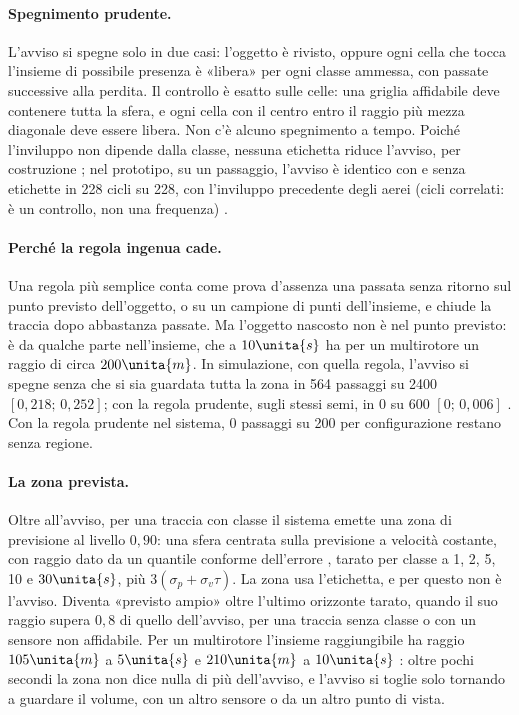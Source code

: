 \paragraph{Spegnimento prudente.} L'avviso si spegne solo in due casi: l'oggetto è rivisto, oppure ogni cella che tocca l'insieme di possibile presenza è «libera» per ogni classe ammessa, con passate successive alla perdita. Il controllo è esatto sulle celle: una griglia affidabile deve contenere tutta la sfera, e ogni cella con il centro entro il raggio più mezza diagonale deve essere libera. Non c'è alcuno spegnimento a tempo. Poiché l'inviluppo non dipende dalla classe, nessuna etichetta riduce l'avviso, per costruzione ; nel prototipo, su un passaggio, l'avviso è identico con e senza etichette in 228 cicli su 228, con l'inviluppo precedente degli aerei (cicli correlati: è un controllo, non una frequenza) .

\paragraph{Perché la regola ingenua cade.} Una regola più semplice conta come prova d'assenza una passata senza ritorno sul punto previsto dell'oggetto, o su un campione di punti dell'insieme, e chiude la traccia dopo abbastanza passate. Ma l'oggetto nascosto non è nel punto previsto: è da qualche parte nell'insieme, che a $10\unita{s}$ ha per un multirotore un raggio di circa $200\unita{m}$. In simulazione, con quella regola, l'avviso si spegne senza che si sia guardata tutta la zona in 564 passaggi su 2400 $[0{,}218;\,0{,}252]$; con la regola prudente, sugli stessi semi, in 0 su 600 $[0;\,0{,}006]$ . Con la regola prudente nel sistema, 0 passaggi su 200 per configurazione restano senza regione.

\paragraph{La zona prevista.} Oltre all'avviso, per una traccia con classe il sistema emette una zona di previsione al livello $0{,}90$: una sfera centrata sulla previsione a velocità costante, con raggio dato da un quantile conforme dell'errore \cite{angelopoulos2021}, tarato per classe a 1, 2, 5, 10 e $30\unita{s}$, più $3(\sigma_p+\sigma_v\tau)$. La zona usa l'etichetta, e per questo non è l'avviso. Diventa «previsto ampio» oltre l'ultimo orizzonte tarato, quando il suo raggio supera $0{,}8$ di quello dell'avviso, per una traccia senza classe o con un sensore non affidabile. Per un multirotore l'insieme raggiungibile ha raggio $105\unita{m}$ a $5\unita{s}$ e $210\unita{m}$ a $10\unita{s}$ : oltre pochi secondi la zona non dice nulla di più dell'avviso, e l'avviso si toglie solo tornando a guardare il volume, con un altro sensore o da un altro punto di vista.

